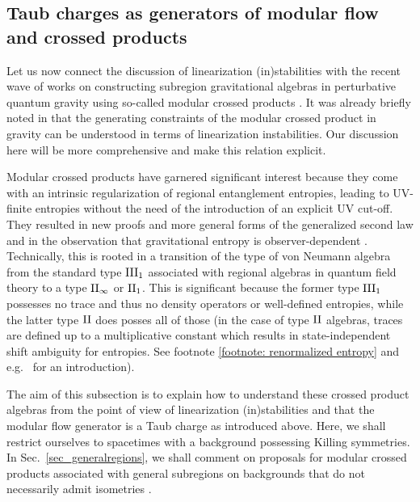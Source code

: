 \documentclass[]{jkpaper}
\theoremstyle{plain}
\theoremstyle{definition}
\begin{document}
\subsection{Taub charges as generators of modular flow and crossed products}\label{ssec_modflow}


Let us now connect the discussion of linearization (in)stabilities with the recent wave of works on constructing subregion gravitational algebras in perturbative quantum gravity using so-called modular crossed products \cite{Chandrasekaran:2022cip,Jensen:2023yxy,Witten:2023qsv,Witten:2023xze,Witten:2021unn,Kudler-Flam:2023hkl,Kudler-Flam:2023qfl,Kudler-Flam:2024psh,DeVuyst:2024pop,Faulkner:2024gst,Aguilar-Gutierrez:2023odp,Chen:2024rpx,Gomez:2023upk,Gomez:2023wrq,Fewster:2024pur,Kolchmeyer:2024fly}. It was already briefly noted in \cite{Jensen:2023yxy,Kaplan:2024xyk} that the generating constraints of the modular crossed product in gravity can be understood in terms of linearization instabilities. Our discussion here will be more comprehensive and make this relation explicit.

Modular crossed products have garnered significant interest because they come with an intrinsic regularization of regional entanglement entropies, leading to UV-finite entropies without the need of the introduction of an explicit UV cut-off. They resulted in new proofs \cite{Faulkner:2024gst} and more general forms \cite{KirklinGSL} of the generalized second law and in the observation that gravitational entropy is observer-dependent \cite{DeVuyst:2024pop,DVEHK}. Technically, this is rooted in a transition of the type of von Neumann algebra from the standard type $\rm{III}_1$ associated with regional algebras in quantum field theory \cite{Fredenhagen:1984dc,Buchholz:1986bg,Buchholz:1995gr,haag2012local,Yngvason_2005} to a type $\rm{II}_\infty$ or $\rm{II}_1$. This is significant because the former type $\rm{III}_1$ possesses no trace and thus no density operators or well-defined entropies, while the latter type $\rm{II}$ does posses all of those (in the case of type $\rm{II}$ algebras, traces are defined up to a multiplicative constant which results in state-independent shift ambiguity for entropies. See footnote \ref{footnote: renormalized entropy} and e.g.\ \cite{WittenRevModPhys.90.045003,Sorce:2023fdx,Takesaki1979,Witten:2021unn} for an introduction). 

The aim of this subsection is to explain how to understand these crossed product algebras from the point of view of linearization (in)stabilities and that the modular flow generator is a Taub charge as introduced above. Here, we shall restrict ourselves to spacetimes with a background possessing Killing symmetries. In Sec.~\ref{sec_generalregions}, we shall comment on proposals for modular crossed products associated with general subregions on backgrounds that do not necessarily admit isometries \cite{Jensen:2023yxy,Chen:2024rpx}. 
\end{document}
